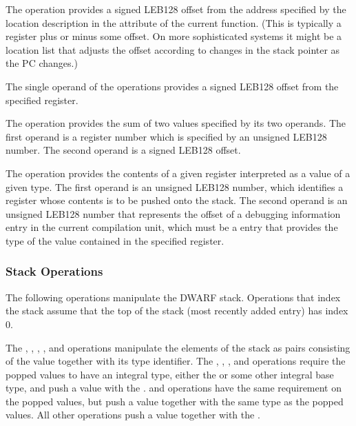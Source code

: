 \begin{enumerate}[1. ]
\itembfnl{\DWOPfbregTARG}
The \DWOPfbregNAME{} operation provides a 
signed LEB128 offset
from the address specified by the location description in the
\DWATframebase{} attribute of the current function. (This
is typically a  register plus or minus
some offset. On more sophisticated systems it might be a
location list that adjusts the offset according to changes
in the stack pointer as the PC changes.)

\itembfnl{\DWOPbregzeroTARG, \DWOPbregoneTARG, \dots, \DWOPbregthirtyoneTARG}
The single operand of the \DWOPbregnTARG{} 
operations provides
a signed LEB128 offset from
the specified register.

\itembfnl{\DWOPbregxTARG}
The \DWOPbregxNAME{} operation provides the sum of two values specified
by its two operands. The first operand is a register number
which is specified by an unsigned LEB128
number. The second operand is a signed LEB128 offset.

\itembfnl{\DWOPregvaltypeTARG}
The \DWOPregvaltypeNAME{} operation provides the contents of
a given register interpreted as a value of a given type. The first 
operand is an unsigned LEB128 number, 
which identifies a register whose contents is to
be pushed onto the stack. The second operand is an 
unsigned LEB128 number
that represents the offset of a debugging information entry in the current
compilation unit, which must be a \DWTAGbasetype{} entry that provides the
type of the value contained in the specified register.

\end{enumerate}

\subsubsection{Stack Operations}
\label{chap:stackoperations}
The following 
operations manipulate the DWARF stack. Operations
that index the stack assume that the top of the stack (most
recently added entry) has index 0.

The \DWOPdup{}, \DWOPdrop{}, \DWOPpick{}, \DWOPover{}, \DWOPswap{}
and \DWOProt{} operations manipulate the elements of the stack as pairs
consisting of the value together with its type identifier. 
The \DWOPderef{}, \DWOPderefsize{}, \DWOPxderef{}, \DWOPxderefsize{} 
and \DWOPformtlsaddress{}
operations require the popped values to have an integral type, either the
\specialaddresstype{} or some other integral base type, and push a 
value with the \specialaddresstype.  
\DWOPdereftype{} and \DWOPxdereftype{} operations have the
same requirement on the popped values, but push a value together 
with the same type as the popped values.
All other operations push a value together with the \specialaddresstype.

